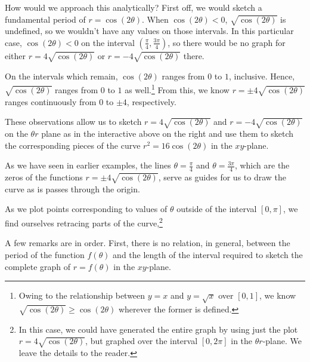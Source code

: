 \documentclass{ximera}
\begin{document}
\begin{example}
\begin{explanation}
\begin{enumerate}
\begin{center}
\end{center}


How would we approach this analytically?  First off, we would sketch a fundamental period of $r = \cos(2\theta)$.  When $\cos(2\theta) < 0$, $\sqrt{\cos(2\theta)}$ is undefined, so we wouldn't have any values on those intervals. In this particular case,  $\cos(2\theta) < 0$ on the interval $\left(\frac{\pi}{4}, \frac{3\pi}{4}\right)$, so there would be no graph for either $r = 4\sqrt{\cos(2\theta)}$ or $r =-4 \sqrt{\cos(2\theta)}$ there.

On the intervals which remain, $\cos(2\theta)$ ranges from $0$ to $1$, inclusive.  Hence, $\sqrt{\cos(2\theta)}$ ranges from $0$ to $1$ as well.\footnote{Owing to the relationship between $y = x$ and $y = \sqrt{x}$ over $[0,1]$, we know $\sqrt{\cos(2\theta)} \geq \cos(2\theta)$ wherever the former is defined.}  From this, we know $r = \pm 4 \sqrt{\cos(2\theta)}$ ranges continuously from $0$ to $\pm 4$, respectively.   

These observations allow us to sketch $r = 4\sqrt{\cos(2\theta)}$ and $r = -4\sqrt{\cos(2\theta)}$ on the $\theta r$ plane as in the interactive above on the right and use them to sketch the corresponding pieces of the curve $r^2 = 16\cos(2\theta)$ in the $xy$-plane.   

As we have seen in earlier examples, the lines $\theta = \frac{\pi}{4}$ and $\theta = \frac{3\pi}{4}$, which are the  zeros of the functions $r = \pm 4 \sqrt{\cos(2\theta)}$, serve as guides for us to draw the curve as is passes through the origin.

As we plot points corresponding to values of  $\theta$ outside of the interval $[0,\pi]$, we find ourselves retracing parts of the curve,\footnote{In this case, we could have generated the entire graph by using just the plot $r = 4\sqrt{\cos(2\theta)}$, but graphed over the interval  $[0,2\pi]$ in the $\theta r$-plane.  We leave the details to the reader.}

 
\end{enumerate}

 
\end{explanation}
\end{example}


A few remarks are in order.  First, there is no relation, in general,  between the period of the function $f(\theta)$  and the length of the interval required to sketch the complete graph of $r = f(\theta)$ in the $xy$-plane.  
\end{document}
